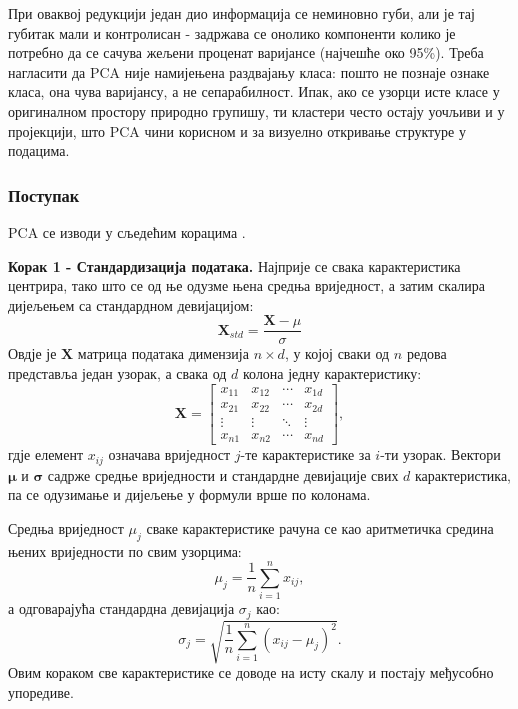 \documentclass{article}
\begin{document}
	При оваквој редукцији један дио информација се неминовно губи, али је тај губитак мали и контролисан - задржава се онолико компоненти колико је потребно да се сачува жељени проценат варијансе (најчешће око 95\%). Треба нагласити да PCA није намијењена раздвајању класа: пошто не познаје ознаке класа, она чува варијансу, а не сепарабилност. Ипак, ако се узорци исте класе у оригиналном простору природно групишу, ти кластери често остају уочљиви и у пројекцији, што PCA чини корисном и за визуелно откривање структуре у подацима.
	
	
	\subsubsection{Поступак}
	
	PCA се изводи у сљедећим корацима \cite{matf_pca}.
	
	\textbf{Корак 1 - Стандардизација података.} Најприје се свака карактеристика центрира, тако што се од ње одузме њена средња вриједност, а затим скалира дијељењем са стандардном девијацијом:
	\begin{equation} \label{eq:pca_std}
	\mathbf{X}_{std} = \frac{\mathbf{X} - \mu}{\sigma}
	\end{equation}
	Овдје је $\mathbf{X}$ матрица података димензија $n \times d$, у којој сваки од $n$ редова представља један узорак, а свака од $d$ колона једну карактеристику:
	\begin{equation} \label{eq:pca_matrix}
		\mathbf{X} =
		\begin{bmatrix}
			x_{11} & x_{12} & \cdots & x_{1d} \\
			x_{21} & x_{22} & \cdots & x_{2d} \\
			\vdots & \vdots & \ddots & \vdots \\
			x_{n1} & x_{n2} & \cdots & x_{nd}
		\end{bmatrix},
	\end{equation}
	гдје елемент $x_{ij}$ означава вриједност $j$-те карактеристике за $i$-ти узорак. Вектори $\boldsymbol{\mu}$ и $\boldsymbol{\sigma}$ садрже средње вриједности и стандардне девијације свих $d$ карактеристика, па се одузимање и дијељење у формули врше по колонама.
	
	Средња вриједност $\mu_j$ сваке карактеристике рачуна се као аритметичка средина њених вриједности по свим узорцима:
	\begin{equation} \label{eq:pca_mean}
		\mu_j = \frac{1}{n} \sum_{i=1}^{n} x_{ij},
	\end{equation}
	а одговарајућа стандардна девијација $\sigma_j$ као:
	\begin{equation} \label{eq:pca_std_dev}
		\sigma_j = \sqrt{\frac{1}{n} \sum_{i=1}^{n} (x_{ij} - \mu_j)^2}.
	\end{equation}
	Овим кораком све карактеристике се доводе на исту скалу и постају међусобно упоредиве.
	
\end{document}
